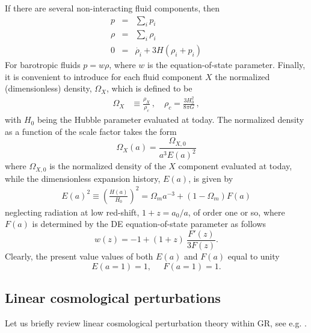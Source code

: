 \documentclass[aps,prd,amsmath,amssymb]{revtex4}
\begin{document}
If there are several non-interacting fluid components, then
\begin{eqnarray}
p & = & \sum_i p_i \\
\rho & = & \sum_i \rho_i \\
0 & = & \dot{\rho_i} + 3 H (\rho_i+p_i)
\end{eqnarray}
For barotropic fluids $p=w \rho$, where $w$ is the equation-of-state parameter. Finally, it is convenient to
introduce for each fluid component $X$ the normalized (dimensionless) density, $\Omega_X$, which is defined to be
\begin{align}
\Omega_X &\equiv \frac{\rho_{X}}{\rho_{c}}\,, \quad \rho_c=\frac{3H_0^2}{8 \pi G}\,,
\end{align}
with $H_0$ being the Hubble parameter evaluated at today. The normalized density as a function of the scale factor 
takes the form
\begin{equation}
\Omega_X(a) = \frac{\Omega_{X,0}}{a^3 E(a)^2}
\end{equation}
where $\Omega_{X,0}$ is the normalized density of the $X$ component evaluated at today, while the dimensionless expansion
history, $E(a)$, is given by 
\begin{align}
E(a)^2 \equiv \left(\frac{H(a)}{H_0}\right)^2 = \Omega_m a^{-3} + (1 - \Omega_m) F(a)
\end{align}
neglecting radiation at low red-shift, $1+z=a_0/a$, of order one or so, where $F(a)$ is determined by the DE 
equation-of-state parameter as follows
\begin{equation}
w(z) = -1 + (1+z) \: \frac{F'(z)}{3 F(z)}.
\end{equation}
Clearly, the present value values of both $E(a)$ and $F(a)$ equal to unity
\begin{equation}
E(a=1) = 1, \; \; \; \; \; F(a=1) = 1.
\end{equation}



\subsection{Linear cosmological perturbations}

Let us briefly review linear cosmological perturbation theory within GR, see e.g. \cite{Mukhanov:2005sc,other}.

\smallskip
\end{document}
